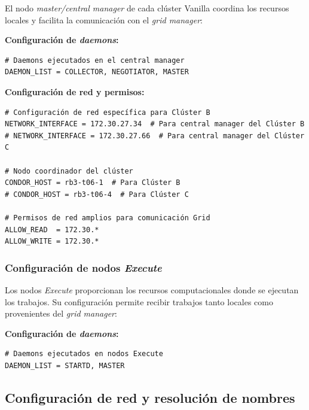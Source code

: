El nodo \textit{master/central manager} de cada clúster Vanilla coordina los recursos locales y facilita la comunicación con el \textit{grid manager}:

\textbf{Configuración de \textit{daemons}:}

\begin{verbatim}
# Daemons ejecutados en el central manager
DAEMON_LIST = COLLECTOR, NEGOTIATOR, MASTER
\end{verbatim}

\textbf{Configuración de red y permisos:}

\begin{verbatim}
# Configuración de red específica para Clúster B
NETWORK_INTERFACE = 172.30.27.34  # Para central manager del Clúster B
# NETWORK_INTERFACE = 172.30.27.66  # Para central manager del Clúster C

# Nodo coordinador del clúster
CONDOR_HOST = rb3-t06-1  # Para Clúster B
# CONDOR_HOST = rb3-t06-4  # Para Clúster C

# Permisos de red amplios para comunicación Grid
ALLOW_READ  = 172.30.*
ALLOW_WRITE = 172.30.*
\end{verbatim}

\FloatBarrier\subsubsection{Configuración de nodos \textit{Execute}}

Los nodos \textit{Execute} proporcionan los recursos computacionales donde se ejecutan los trabajos. Su configuración permite recibir trabajos tanto locales como provenientes del \textit{grid manager}:

\textbf{Configuración de \textit{daemons}:}

\begin{verbatim}
# Daemons ejecutados en nodos Execute
DAEMON_LIST = STARTD, MASTER
\end{verbatim}

\FloatBarrier\subsection{Configuración de red y resolución de nombres}

